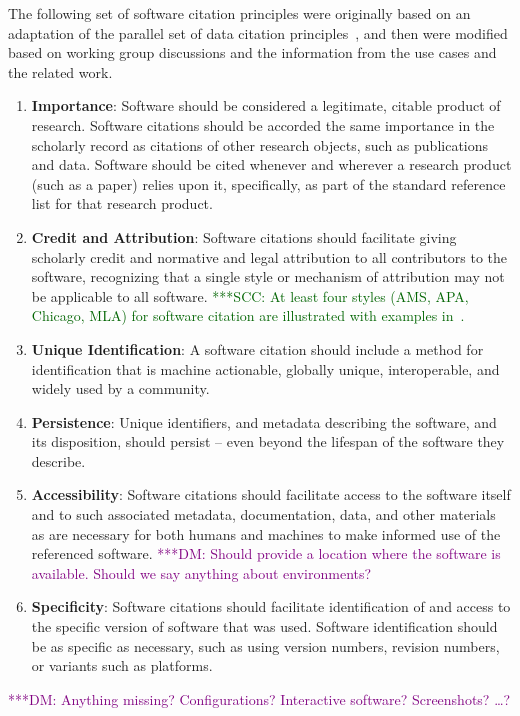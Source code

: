 \documentclass[11pt, oneside]{amsart}
\newcommand{\scnote}[1]{ {\textcolor{darkgreen} { ***SCC: #1 }}} %
\newcommand{\dmnote}[1]{ {\textcolor{purple} { ***DM: #1 }}} %
\begin{document}
The following set of software citation principles were originally based on an adaptation of the parallel set of data citation principles~\cite{data-citation-principles}, and then were modified based on working group discussions and the information from the use cases and the related work.

\begin{enumerate}
\item \textbf{Importance}:
Software should be considered a legitimate, citable product of research. Software citations should be accorded the same importance in the scholarly record as citations of other research objects, such as publications and data. Software should be cited whenever and wherever a research product (such as a paper) relies upon it, specifically, as part of the standard reference list for that research product.
\item \textbf{Credit and Attribution}:
Software citations should facilitate giving scholarly credit and normative
and legal attribution to all contributors to the software, recognizing
that a single style or mechanism of attribution may not be applicable to
all software. \scnote{At least four styles (AMS, APA, Chicago, MLA) for
software citation are illustrated with examples in~\cite{lipson2011cite}.}
\item \textbf{Unique Identification}:
A software citation should include a method for identification that is
machine actionable, globally unique, interoperable, and widely used by
a community.
\item \textbf{Persistence}:
Unique identifiers, and metadata describing the software, and its disposition, should persist -- even beyond the lifespan of the software they describe.
\item \textbf{Accessibility}:
Software citations should facilitate access to the software itself and to such associated metadata, documentation, data, and other materials as are necessary for both humans and machines to make informed use of the referenced software.\dmnote{Should provide a location where the software is available. Should we say anything about environments?}
\item \textbf{Specificity}:
Software citations should facilitate identification of and access to the specific version of software that was used.  Software identification should be as specific as necessary, such as using version numbers, revision numbers, or variants such as platforms.
\end{enumerate}
\dmnote{ Anything missing? Configurations? Interactive software? Screenshots? \ldots ?}
\end{document}
